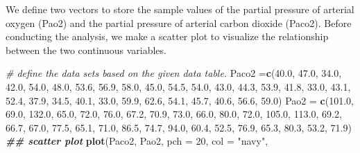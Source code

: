 \documentclass[
]{book}
\newenvironment{Shaded}{\begin{snugshade}}{\end{snugshade}}
\newcommand{\AttributeTok}[1]{\textcolor[rgb]{0.13,0.29,0.53}{#1}}
\newcommand{\CommentTok}[1]{\textcolor[rgb]{0.56,0.35,0.01}{\textit{#1}}}
\newcommand{\DecValTok}[1]{\textcolor[rgb]{0.00,0.00,0.81}{#1}}
\newcommand{\DocumentationTok}[1]{\textcolor[rgb]{0.56,0.35,0.01}{\textbf{\textit{#1}}}}
\newcommand{\FloatTok}[1]{\textcolor[rgb]{0.00,0.00,0.81}{#1}}
\newcommand{\FunctionTok}[1]{\textcolor[rgb]{0.13,0.29,0.53}{\textbf{#1}}}
\newcommand{\NormalTok}[1]{#1}
\newcommand{\OtherTok}[1]{\textcolor[rgb]{0.56,0.35,0.01}{#1}}
\newcommand{\StringTok}[1]{\textcolor[rgb]{0.31,0.60,0.02}{#1}}
\begin{document}
We define two vectors to store the sample values of the partial pressure of arterial oxygen (Pao2) and the partial pressure of arterial carbon dioxide (Paco2). Before conducting the analysis, we make a scatter plot to visualize the relationship between the two continuous variables.

\begin{Shaded}
\begin{Highlighting}[]
\CommentTok{\# define the data sets based on the given data table.}
\NormalTok{Paco2 }\OtherTok{=}\FunctionTok{c}\NormalTok{(}\FloatTok{40.0}\NormalTok{, }\FloatTok{47.0}\NormalTok{, }\FloatTok{34.0}\NormalTok{, }\FloatTok{42.0}\NormalTok{, }\FloatTok{54.0}\NormalTok{, }\FloatTok{48.0}\NormalTok{, }\FloatTok{53.6}\NormalTok{, }\FloatTok{56.9}\NormalTok{, }\FloatTok{58.0}\NormalTok{, }\FloatTok{45.0}\NormalTok{, }\FloatTok{54.5}\NormalTok{, }\FloatTok{54.0}\NormalTok{, }
         \FloatTok{43.0}\NormalTok{, }\FloatTok{44.3}\NormalTok{, }\FloatTok{53.9}\NormalTok{, }\FloatTok{41.8}\NormalTok{, }\FloatTok{33.0}\NormalTok{, }\FloatTok{43.1}\NormalTok{, }\FloatTok{52.4}\NormalTok{, }\FloatTok{37.9}\NormalTok{, }\FloatTok{34.5}\NormalTok{, }\FloatTok{40.1}\NormalTok{, }\FloatTok{33.0}\NormalTok{, }\FloatTok{59.9}\NormalTok{, }
         \FloatTok{62.6}\NormalTok{, }\FloatTok{54.1}\NormalTok{, }\FloatTok{45.7}\NormalTok{, }\FloatTok{40.6}\NormalTok{, }\FloatTok{56.6}\NormalTok{, }\FloatTok{59.0}\NormalTok{)}
\NormalTok{Pao2 }\OtherTok{=} \FunctionTok{c}\NormalTok{(}\FloatTok{101.0}\NormalTok{, }\FloatTok{69.0}\NormalTok{, }\FloatTok{132.0}\NormalTok{, }\FloatTok{65.0}\NormalTok{, }\FloatTok{72.0}\NormalTok{, }\FloatTok{76.0}\NormalTok{, }\FloatTok{67.2}\NormalTok{, }\FloatTok{70.9}\NormalTok{, }\FloatTok{73.0}\NormalTok{, }\FloatTok{66.0}\NormalTok{, }\FloatTok{80.0}\NormalTok{, }
         \FloatTok{72.0}\NormalTok{, }\FloatTok{105.0}\NormalTok{, }\FloatTok{113.0}\NormalTok{, }\FloatTok{69.2}\NormalTok{, }\FloatTok{66.7}\NormalTok{, }\FloatTok{67.0}\NormalTok{, }\FloatTok{77.5}\NormalTok{, }\FloatTok{65.1}\NormalTok{, }\FloatTok{71.0}\NormalTok{, }\FloatTok{86.5}\NormalTok{, }\FloatTok{74.7}\NormalTok{, }
         \FloatTok{94.0}\NormalTok{, }\FloatTok{60.4}\NormalTok{, }\FloatTok{52.5}\NormalTok{, }\FloatTok{76.9}\NormalTok{, }\FloatTok{65.3}\NormalTok{, }\FloatTok{80.3}\NormalTok{, }\FloatTok{53.2}\NormalTok{, }\FloatTok{71.9}\NormalTok{)}
\DocumentationTok{\#\# scatter plot}
\FunctionTok{plot}\NormalTok{(Paco2, Pao2, }
     \AttributeTok{pch =} \DecValTok{20}\NormalTok{,}
     \AttributeTok{col =} \StringTok{"navy"}\NormalTok{,}

\end{Highlighting}
\end{Shaded}
\end{document}
